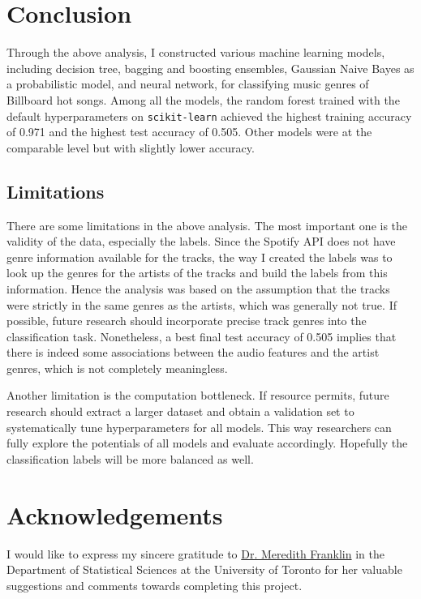 \documentclass{article}
\begin{document}
\section{Conclusion}

Through the above analysis, I constructed various machine learning models, including decision tree, bagging and boosting ensembles, Gaussian Naive Bayes as a probabilistic model, and neural network, for classifying music genres of Billboard hot songs. Among all the models, the random forest trained with the default hyperparameters on \texttt{scikit-learn} achieved the highest training accuracy of 0.971 and the highest test accuracy of 0.505. Other models were at the comparable level but with slightly lower accuracy.

\subsection{Limitations}

There are some limitations in the above analysis. The most important one is the validity of the data, especially the labels. Since the Spotify API does not have genre information available for the tracks, the way I created the labels was to look up the genres for the artists of the tracks and build the labels from this information. Hence the analysis was based on the assumption that the tracks were strictly in the same genres as the artists, which was generally not true. If possible, future research should incorporate precise track genres into the classification task. Nonetheless, a best final test accuracy of 0.505 implies that there is indeed some associations between the audio features and the artist genres, which is not completely meaningless.

Another limitation is the computation bottleneck. If resource permits, future research should extract a larger dataset and obtain a validation set to systematically tune hyperparameters for all models. This way researchers can fully explore the potentials of all models and evaluate accordingly. Hopefully the classification labels will be more balanced as well.

\section{Acknowledgements}

I would like to express my sincere gratitude to \href{https://meredithfranklin.github.io/}{Dr. Meredith Franklin} in the Department of Statistical Sciences at the University of Toronto for her valuable suggestions and comments towards completing this project.
\end{document}
